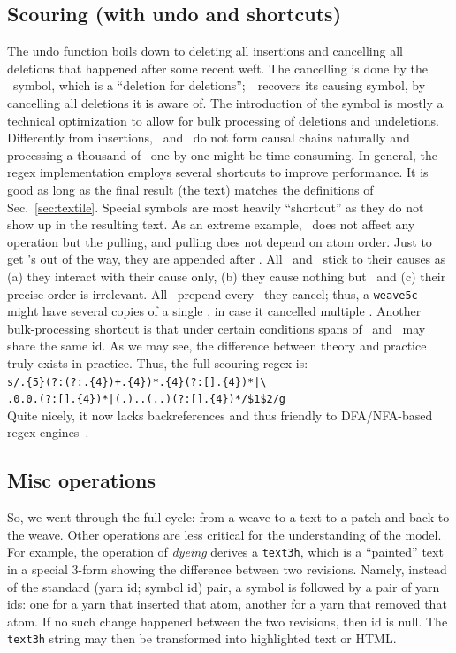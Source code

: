 \documentclass{sig-alternate}
\begin{document}
\subsection{Scouring (with undo and shortcuts)}	\label{sec:undo}
The undo function boils down to deleting all insertions and cancelling all deletions that happened after some recent weft.
The cancelling is done by the \cnc ~symbol, which is a ``deletion for deletions'';~\cnc ~recovers its causing symbol, by cancelling all deletions it is aware of.
The introduction of the symbol is mostly a technical optimization to allow for bulk processing of deletions and undeletions. 
Differently from insertions, \bsp ~and \cnc ~do not form causal chains naturally and processing a thousand of \bsp ~one by one might be time-consuming.
In general, the regex implementation employs several shortcuts to improve performance.
It is good as long as the final result (the text) matches the definitions of Sec.~\ref{sec:textile}.
Special symbols are most heavily ``shortcut'' as they do not show up in the resulting text.
As an extreme example, \zero ~does not affect any operation but the pulling, and pulling does not depend on atom order.
Just to get \zero's out of the way, they are appended after \eoa.
All \bsp ~and \cnc ~stick to their causes as (a) they interact with their cause only, (b) they cause nothing but \zero ~and (c) their precise order is irrelevant.
All \cnc ~prepend every \bsp ~they cancel; thus, a {\tt weave5c} might have  several copies of a single \cnc, in case it cancelled multiple \bsp.
Another bulk-processing shortcut is that under certain conditions spans of \bsp ~and \cnc ~may share the same id.
As we may see, the difference between theory and practice truly exists in practice.
Thus, the full scouring regex is: \\
{\small \verb`s/.{5}(?:(?:`\cnc\verb`.{4})+`\bsp\verb`.{4})*`\bsp\verb`.{4}(?:[`\bsp\verb``\cnc\verb`].{4})*|\`\\
\verb`.0.0.(?:[`\bsp\zero\cnc\verb`].{4})*|`\verb`(.)..(..)(?:[`\bsp\verb``\cnc\verb`].{4})*/$1$2/g`}\\
Quite nicely, it now lacks backreferences and thus friendly to DFA/NFA-based regex engines~\cite{re2}.

\subsection{Misc operations}

So, we went through the full cycle: from a weave to a text to a patch and back to the weave.
Other operations are less critical for the understanding of the model.
For example, the operation of \emph{dyeing} derives a {\tt text3h}, which is a ``painted'' text in a special 3-form showing the difference between two revisions. 
Namely, instead of the standard (yarn id; symbol id) pair, a symbol is followed by a pair of yarn ids: one for a yarn that inserted that atom, another for a yarn that removed that atom.
If no such change happened between the two revisions, then id is null.
The {\tt text3h} string may then be transformed into highlighted text or HTML.
\end{document}

